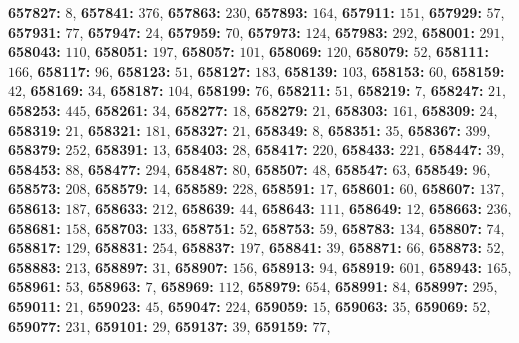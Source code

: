 \textsf{\bfseries 657827:} $8$, \textsf{\bfseries 657841:} $376$, \textsf{\bfseries 657863:} $230$, \textsf{\bfseries 657893:} $164$, \textsf{\bfseries 657911:} $151$, \textsf{\bfseries 657929:} $57$, \textsf{\bfseries 657931:} $77$, \textsf{\bfseries 657947:} $24$, \textsf{\bfseries 657959:} $70$, \textsf{\bfseries 657973:} $124$, \textsf{\bfseries 657983:} $292$, \textsf{\bfseries 658001:} $291$, \textsf{\bfseries 658043:} $110$, \textsf{\bfseries 658051:} $197$, \textsf{\bfseries 658057:} $101$, \textsf{\bfseries 658069:} $120$, \textsf{\bfseries 658079:} $52$, \textsf{\bfseries 658111:} $166$, \textsf{\bfseries 658117:} $96$, \textsf{\bfseries 658123:} $51$, \textsf{\bfseries 658127:} $183$, \textsf{\bfseries 658139:} $103$, \textsf{\bfseries 658153:} $60$, \textsf{\bfseries 658159:} $42$, \textsf{\bfseries 658169:} $34$, \textsf{\bfseries 658187:} $104$, \textsf{\bfseries 658199:} $76$, \textsf{\bfseries 658211:} $51$, \textsf{\bfseries 658219:} $7$, \textsf{\bfseries 658247:} $21$, \textsf{\bfseries 658253:} $445$, \textsf{\bfseries 658261:} $34$, \textsf{\bfseries 658277:} $18$, \textsf{\bfseries 658279:} $21$, \textsf{\bfseries 658303:} $161$, \textsf{\bfseries 658309:} $24$, \textsf{\bfseries 658319:} $21$, \textsf{\bfseries 658321:} $181$, \textsf{\bfseries 658327:} $21$, \textsf{\bfseries 658349:} $8$, \textsf{\bfseries 658351:} $35$, \textsf{\bfseries 658367:} $399$, \textsf{\bfseries 658379:} $252$, \textsf{\bfseries 658391:} $13$, \textsf{\bfseries 658403:} $28$, \textsf{\bfseries 658417:} $220$, \textsf{\bfseries 658433:} $221$, \textsf{\bfseries 658447:} $39$, \textsf{\bfseries 658453:} $88$, \textsf{\bfseries 658477:} $294$, \textsf{\bfseries 658487:} $80$, \textsf{\bfseries 658507:} $48$, \textsf{\bfseries 658547:} $63$, \textsf{\bfseries 658549:} $96$, \textsf{\bfseries 658573:} $208$, \textsf{\bfseries 658579:} $14$, \textsf{\bfseries 658589:} $228$, \textsf{\bfseries 658591:} $17$, \textsf{\bfseries 658601:} $60$, \textsf{\bfseries 658607:} $137$, \textsf{\bfseries 658613:} $187$, \textsf{\bfseries 658633:} $212$, \textsf{\bfseries 658639:} $44$, \textsf{\bfseries 658643:} $111$, \textsf{\bfseries 658649:} $12$, \textsf{\bfseries 658663:} $236$, \textsf{\bfseries 658681:} $158$, \textsf{\bfseries 658703:} $133$, \textsf{\bfseries 658751:} $52$, \textsf{\bfseries 658753:} $59$, \textsf{\bfseries 658783:} $134$, \textsf{\bfseries 658807:} $74$, \textsf{\bfseries 658817:} $129$, \textsf{\bfseries 658831:} $254$, \textsf{\bfseries 658837:} $197$, \textsf{\bfseries 658841:} $39$, \textsf{\bfseries 658871:} $66$, \textsf{\bfseries 658873:} $52$, \textsf{\bfseries 658883:} $213$, \textsf{\bfseries 658897:} $31$, \textsf{\bfseries 658907:} $156$, \textsf{\bfseries 658913:} $94$, \textsf{\bfseries 658919:} $601$, \textsf{\bfseries 658943:} $165$, \textsf{\bfseries 658961:} $53$, \textsf{\bfseries 658963:} $7$, \textsf{\bfseries 658969:} $112$, \textsf{\bfseries 658979:} $654$, \textsf{\bfseries 658991:} $84$, \textsf{\bfseries 658997:} $295$, \textsf{\bfseries 659011:} $21$, \textsf{\bfseries 659023:} $45$, \textsf{\bfseries 659047:} $224$, \textsf{\bfseries 659059:} $15$, \textsf{\bfseries 659063:} $35$, \textsf{\bfseries 659069:} $52$, \textsf{\bfseries 659077:} $231$, \textsf{\bfseries 659101:} $29$, \textsf{\bfseries 659137:} $39$, \textsf{\bfseries 659159:} $77$, 
